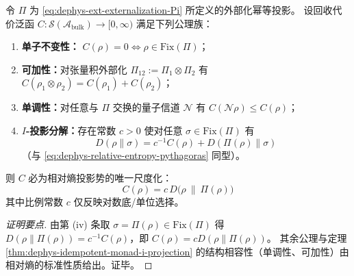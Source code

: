 \begin{proposition}\label{prop:dephys-idempotent-monad-entropy-axiomatic-uniqueness}
令 \(\Pi\) 为 \eqref{eq:dephys-ext-externalization-Pi} 所定义的外部化幂等投影。
设回收代价泛函 \(C:\mathcal{S}(\mathcal{A}_{\mathrm{bulk}})\to[0,\infty)\) 满足下列公理族：
\begin{enumerate}
  \item \textbf{单子不变性：} \(C(\rho)=0\iff \rho\in\mathrm{Fix}(\Pi)\)；
  \item \textbf{可加性：}对张量积外部化 \(\Pi_{12}:=\Pi_1\otimes\Pi_2\) 有 \(C(\rho_1\otimes\rho_2)=C(\rho_1)+C(\rho_2)\)；
  \item \textbf{单调性：}对任意与 \(\Pi\) 交换的量子信道 \(\mathcal{N}\) 有 \(C(\mathcal{N}\rho)\le C(\rho)\)；
  \item \textbf{\(I\)-投影分解：}存在常数 \(c>0\) 使对任意 \(\sigma\in\mathrm{Fix}(\Pi)\) 有
  \[
  \boxed{\;
  D(\rho\|\sigma)=c^{-1}C(\rho)+D(\Pi(\rho)\|\sigma)\;}
  \]
  （与 \eqref{eq:dephys-relative-entropy-pythagoras} 同型）。
\end{enumerate}
则 \(C\) 必为相对熵投影势的唯一尺度化：
\[
\boxed{\;
C(\rho)=c\,D\bigl(\rho\ \|\ \Pi(\rho)\bigr)\;}
\]
其中比例常数 \(c\) 仅反映对数底/单位选择。
\end{proposition}
\begin{proof}[证明要点]
由第 (iv) 条取 \(\sigma=\Pi(\rho)\in\mathrm{Fix}(\Pi)\) 得
\(
D(\rho\|\Pi(\rho))=c^{-1}C(\rho)
\)，即 \(C(\rho)=cD(\rho\|\Pi(\rho))\)。
其余公理与定理 \ref{thm:dephys-idempotent-monad-i-projection} 的结构相容性（单调性、可加性）由相对熵的标准性质给出。证毕。
\end{proof}

